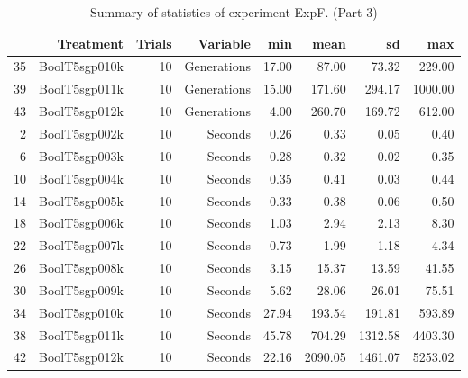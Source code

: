\begin{table}[ht]
\centering
\begin{tabular}{rrrrrrrr}
  \hline
 & Treatment & Trials & Variable & min & mean & sd & max \\ 
  \hline
35 & BoolT5sgp010k &  10 & Generations & 17.00 & 87.00 & 73.32 & 229.00 \\ 
  39 & BoolT5sgp011k &  10 & Generations & 15.00 & 171.60 & 294.17 & 1000.00 \\ 
  43 & BoolT5sgp012k &  10 & Generations & 4.00 & 260.70 & 169.72 & 612.00 \\ 
  2 & BoolT5sgp002k &  10 & Seconds & 0.26 & 0.33 & 0.05 & 0.40 \\ 
  6 & BoolT5sgp003k &  10 & Seconds & 0.28 & 0.32 & 0.02 & 0.35 \\ 
  10 & BoolT5sgp004k &  10 & Seconds & 0.35 & 0.41 & 0.03 & 0.44 \\ 
  14 & BoolT5sgp005k &  10 & Seconds & 0.33 & 0.38 & 0.06 & 0.50 \\ 
  18 & BoolT5sgp006k &  10 & Seconds & 1.03 & 2.94 & 2.13 & 8.30 \\ 
  22 & BoolT5sgp007k &  10 & Seconds & 0.73 & 1.99 & 1.18 & 4.34 \\ 
  26 & BoolT5sgp008k &  10 & Seconds & 3.15 & 15.37 & 13.59 & 41.55 \\ 
  30 & BoolT5sgp009k &  10 & Seconds & 5.62 & 28.06 & 26.01 & 75.51 \\ 
  34 & BoolT5sgp010k &  10 & Seconds & 27.94 & 193.54 & 191.81 & 593.89 \\ 
  38 & BoolT5sgp011k &  10 & Seconds & 45.78 & 704.29 & 1312.58 & 4403.30 \\ 
  42 & BoolT5sgp012k &  10 & Seconds & 22.16 & 2090.05 & 1461.07 & 5253.02 \\ 
   \hline
\end{tabular}
\caption{Summary of statistics of experiment ExpF. (Part 3)} 
\end{table}
